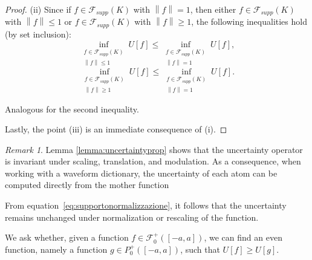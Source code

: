 \documentclass[preprint,hidelinks,authoryear]{elsarticle}
\theoremstyle{plain}
\theoremstyle{definition}
\newtheorem{example}[theorem]{Example}
\theoremstyle{remark}
\newtheorem{remark}[theorem]{Remark}
\begin{document}
\begin{proof}
(ii) Since if $f \in \mathcal{F}_{supp}(K)$ with $\left\| f \right\| = 1$, then either $f \in \mathcal{F}_{supp}(K)$ with $\left\| f \right\| \leq 1$ or $f \in \mathcal{F}_{supp}(K)$ with $\left\| f \right\| \geq 1$, the following inequalities hold (by set inclusion):
$$
\inf_{\substack{f \in \mathcal{F}_{supp}(K) \\ \left\| f \right\| \leq 1}} U[f] \leq \inf_{\substack{f \in \mathcal{F}_{supp}(K) \\ \left\| f \right\| = 1}} U[f],
$$
$$
\inf_{\substack{f \in \mathcal{F}_{supp}(K) \\ \left\| f \right\| \geq 1}} U[f] \leq \inf_{\substack{f \in \mathcal{F}_{supp}(K) \\ \left\| f \right\| = 1}} U[f].
$$


Analogous for the second inequality.


Lastly, the point (iii) is an immediate consequence of (i).
\end{proof}
\begin{remark}
Lemma \ref{lemma:uncertaintyprop} shows that the uncertainty operator is invariant under scaling, translation, and modulation. As a consequence, when working with a waveform dictionary, the uncertainty of each atom can be computed directly from the mother function
\end{remark}



From equation~\eqref{eq:supportonormalizzazione}, it follows that the uncertainty remains unchanged under normalization or rescaling of the function.









We ask whether, given a function $ f \in \mathcal{F}_0^+([-a,a]) $, we can find an even function, namely a function $ g \in P_0^+([-a,a]) $, such that $ U[f] \geq U[g] $.
\end{document}
